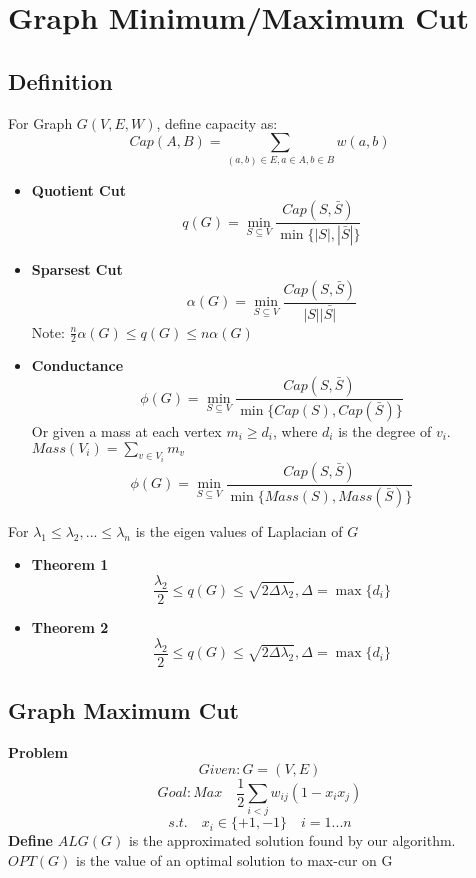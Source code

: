 \section{Graph Minimum/Maximum Cut}
\subsection{Definition}
For Graph $G(V,E,W)$, define capacity as:
\begin{equation}
\nonumber
Cap(A,B)=\sum_{(a,b)\in E,a\in A,b\in B}w(a,b)
\end{equation}
\begin{itemize}
    \item \textbf{Quotient Cut}
    \[\displaystyle
    q(G)=\min_{S\subseteq V}\frac{Cap(S,\bar{S})}{\min\{|S|,|\bar{S}|\}}
    \]
    \item \textbf{Sparsest Cut}
    \[\displaystyle
    \alpha(G)=\min_{S\subseteq V}\frac{Cap(S,\bar{S})}{|S||\bar{S|}}
    \]
    Note:  $\frac{n}{2}\alpha(G)\leq q(G) \leq n\alpha (G)$
    \item \textbf{Conductance}
    \[\displaystyle
    \phi(G)=\min_{S\subseteq V}\frac{Cap(S,\bar{S})}{\min\{Cap(S), Cap(\bar{S})\}}
    \]
    Or given a mass at each vertex $m_i\geq d_i$, where $d_i$ is the degree of $v_i$. $Mass(V_i)=\sum_{v\in V_i } m_v$
    \[\displaystyle
    \phi(G)=\min_{S\subseteq V}\frac{Cap(S,\bar{S})}{\min\{Mass(S), Mass(\bar S)\}}
    \]
\end{itemize}


For $\lambda_1 \leq \lambda_2,...\leq \lambda_n$ is the eigen values of Laplacian of $G$
\begin{itemize}
    \item \textbf{Theorem 1}
    \[
    \frac{\lambda_2}{2}\leq q(G) \leq\sqrt{2\Delta \lambda_2}, \Delta=\max\{d_i\}
    \]
    \item \textbf{Theorem 2}
    \[
    \frac{\lambda_2}{2}\leq q(G) \leq\sqrt{2\Delta \lambda_2}, \Delta=\max\{d_i\}
    \]
\end{itemize}

\subsection{Graph Maximum Cut}
\textbf{Problem}
\[
Given: G=(V,E)
\]
\[
Goal: Max\quad \frac{1}{2}\sum_{i<j}w_{ij}(1-x_ix_j)
\]
\[
s.t. \quad x_i \in \{+1,-1\} \quad i=1...n
\]
\textbf{Define} 
$ALG(G)$ is the approximated solution found by our algorithm. $OPT(G)$ is the value of an optimal solution to max-cur on G

